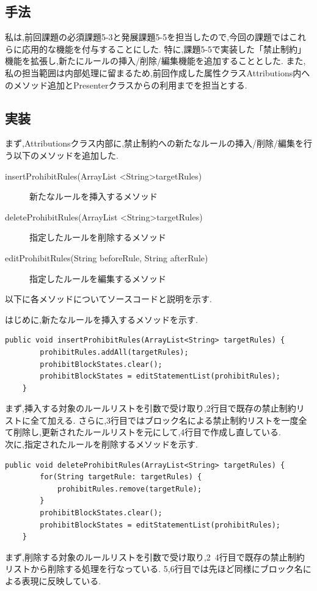 \documentclass[12pt]{jarticle}
\begin{document}
\subsection{手法}
私は,前回課題の必須課題5-3と発展課題5-5を担当したので,今回の課題ではこれらに応用的な機能を付与することにした.
特に,課題5-5で実装した「禁止制約」機能を拡張し,新たにルールの挿入/削除/編集機能を追加することとした.
また,私の担当範囲は内部処理に留まるため,前回作成した属性クラスAttributions内へのメソッド追加とPresenterクラスからの利用までを担当とする.


\subsection{実装}
まず,Attributionsクラス内部に,禁止制約への新たなルールの挿入/削除/編集を行う以下のメソッドを追加した.
\begin{description}
\item[insertProhibitRules(ArrayList \textless String\textgreater targetRules)] 新たなルールを挿入するメソッド
\item[deleteProhibitRules(ArrayList \textless String\textgreater targetRules)] 指定したルールを削除するメソッド
\item[editProhibitRules(String beforeRule, String afterRule)] 指定したルールを編集するメソッド
\end{description}
以下に各メソッドについてソースコードと説明を示す.

はじめに,新たなルールを挿入するメソッドを示す.
\begin{lstlisting}[caption=insertProhibitRulesメソッドの実装, label=mid]
    public void insertProhibitRules(ArrayList<String> targetRules) {
		prohibitRules.addAll(targetRules);
		prohibitBlockStates.clear();
		prohibitBlockStates = editStatementList(prohibitRules);
	}
\end{lstlisting}
まず,挿入する対象のルールリストを引数で受け取り,2行目で既存の禁止制約リストに全て加える.
さらに,3行目ではブロック名による禁止制約リストを一度全て削除し,更新されたルールリストを元にして,4行目で作成し直している. \\

次に,指定されたルールを削除するメソッドを示す.
\begin{lstlisting}[caption=deleteProhibitRulesメソッドの実装, label=mid]
    public void deleteProhibitRules(ArrayList<String> targetRules) {
		for(String targetRule: targetRules) {
			prohibitRules.remove(targetRule);
		}
		prohibitBlockStates.clear();
		prohibitBlockStates = editStatementList(prohibitRules);
	}
\end{lstlisting}
まず,削除する対象のルールリストを引数で受け取り,2~4行目で既存の禁止制約リストから削除する処理を行なっている.
5,6行目では先ほど同様にブロック名による表現に反映している. \\
\end{document}
